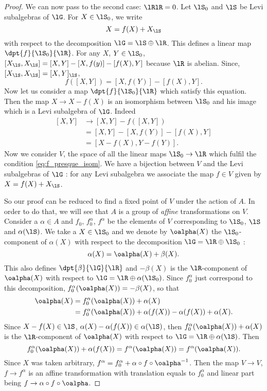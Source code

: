 \begin{proof}
We can now pass to the second case: $\lRlR=0$.
Let $\lS_0$ and $\lS$ be Levi subalgebras of $\lG$. For $X\in\lS_0$, we write
\[
   X=f(X)+X_{\lS}
\]
with respect to the decomposition $\lG=\lS\oplus\lR$. This defines a linear map $\dpt{f}{\lS_0}{\lR}$. For any $X$, $Y\in\lS_0$, $[X_{\lS},X_{\lS}]=[X,Y]-[X,f(y)]-[f(X),Y]$ because $\lR$ is abelian. Since, $[X_{\lS},X_{\lS}]=[X,Y]_{\lS}$,
\begin{equation}\label{eq:f_presque_isom}
f([X,Y])=[X,f(Y)]-[f(X),Y].
\end{equation}
Now let us consider a map $\dpt{f}{\lS_0}{\lR}$ which satisfy this equation. Then the map $X\to X-f(X)$ is an isomorphism between $\lS_0$ and his image which is a Levi subalgebra of $\lG$. Indeed
\begin{equation}
\begin{split}
[X,Y]&\to[X,Y]-f([X,Y])\\
     &=[X,Y]-[X,f(Y)]-[f(X),Y]\\
     &=[X-f(X),Y-f(Y)].
\end{split}
\end{equation}
Now we consider $V$, the space of all the linear maps $\lS_0\to\lR$ which fulfil the condition \eqref{eq:f_presque_isom}. We have a bijection between $V$ and the Levi subalgebras of $\lG$ : for any Levi subalgebra we associate the map $f\in V$ given by $X=f(X)+X_{\lS}$.

So our proof can be reduced to find a fixed point of $V$ under the action of $A$. In order to do that, we will see that $A$ is a group of \emph{affine} transformations on $V$. Consider a $\alpha\in A$ and $f_0$, $f_0^{\alpha}$, $f^{\alpha}$ be the elements of $V$ corresponding to $\lS_0$, $\lS$ and $\alpha(\lS)$. We take a $X\in\lS_0$ and we denote by $\oalpha(X)$ the $\lS_0$-component of $\alpha(X)$ with respect to the decomposition $\lG=\lR\oplus\lS_0$ :
\[
   \alpha(X)=\oalpha(X)+\beta(X).
\]
This also defines $\dpt{\beta}{\lG}{\lR}$ and $-\beta(X)$ is the $\lR$-component of $\oalpha(X)$ with respect to $\lG=\lR\oplus\alpha(\lS_0)$. Since $f_0^{\alpha}$ just correspond to this decomposition, $f_0^{\alpha}(\oalpha(X))=-\beta(X)$, so that 
\begin{equation}
\begin{split}
\oalpha(X)&=f_0^{\alpha}(\oalpha(X))+\alpha(X)\\
          &=f_0^{\alpha}(\oalpha(X))+\alpha(f(X))-\alpha(f(X))+\alpha(X).
\end{split}
\end{equation}
Since $X-f(X)\in\lS$, $\alpha(X)-\alpha(f(X))\in\alpha(\lS)$, then $f_0^{\alpha}(\oalpha(X))+\alpha(X)$ is the $\lR$-component of $\oalpha(X)$ with respect to $\lG=\lR\oplus\alpha(\lS)$. Then 
\[
   f_0^{\alpha}(\oalpha(X))+\alpha(f(X))=f^{\alpha}(\oalpha(X))=f^{\alpha}(\oalpha(X)).
\]
Since $X$ was taken arbitrary, $f^{\alpha}=f^{\alpha}_0+\alpha\circ f\circ\oalpha^{-1}$. Then the map $V\to V$, $f\to f^{\alpha}$ is an affine transformation with translation equals to $f_0^{\alpha}$ and linear part being $f\to\alpha\circ f\circ\oalpha$.


\end{proof}
